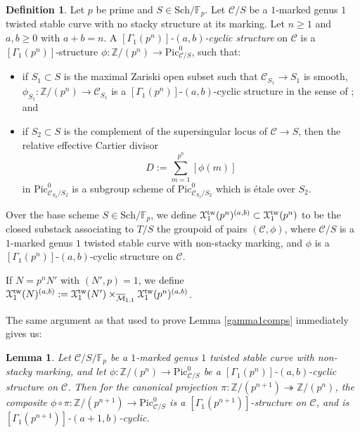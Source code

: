 \documentclass[11pt]{amsart}
\newtheorem{lemma}[subsection]{Lemma}
\theoremstyle{definition}
\newtheorem{definition}[subsection]{Definition}
\begin{document}
\begin{definition}\label{abcyclictwisted}
Let $p$ be prime and $S \in \mathrm{Sch}/\mathbb{F}_p$. Let ${\mathcal{C}}/S$ be a $1$-marked genus $1$ twisted stable curve with no stacky structure at its marking. Let $n\geq 1$ and $a,b\geq 0$ with $a+b=n$. A \textit{$[\Gamma_1(p^n)]$-$(a,b)$-cyclic structure} on ${\mathcal{C}}$ is a $[\Gamma_1(p^n)]$-structure $\phi: \mathbb{Z}/(p^n) \rightarrow \mathrm{Pic}^0_{{\mathcal{C}}/S}$, such that: 
\begin{itemize}
  \item if $S_1 \subset S$ is the maximal Zariski open subset such that ${\mathcal{C}}_{S_1} \rightarrow S_1$ is smooth, $\phi_{S_1}: \mathbb{Z}/(p^n) \rightarrow {\mathcal{C}}_{S_1}$ is a $[\Gamma_1(p^n)]$-$(a,b)$-cyclic structure in the sense of \cite{KM1}; and 
  \item if $S_2 \subset S$ is the complement of the supersingular locus of ${\mathcal{C}} \rightarrow S$, then the relative effective Cartier divisor 
  \begin{displaymath}
  D := \sum_{m=1}^{p^b} [\phi(m)]
  \end{displaymath}
  in $\mathrm{Pic}^0_{{\mathcal{C}}_{S_2}/S_2}$ is a subgroup scheme of $\mathrm{Pic}^0_{{\mathcal{C}}_{S_2}/S_2}$ which is \'etale over $S_2$. 
\end{itemize}
Over the base scheme $S \in \mathrm{Sch}/\mathbb{F}_p$, we define ${\mathbf{\EuScript{X}}}^{\mathrm{tw}}_1(p^n)^{(a,b)} \subset {\mathbf{\EuScript{X}}}^{\mathrm{tw}}_1(p^n)$ to be the closed substack associating to $T/S$ the groupoid of pairs $({\mathcal{C}},\phi)$, where ${\mathcal{C}}/S$ is a $1$-marked genus $1$ twisted stable curve with non-stacky marking, and $\phi$ is a $[\Gamma_1(p^n)]$-$(a,b)$-cyclic structure on ${\mathcal{C}}$.

If $N = p^nN'$ with $(N',p) = 1$, we define ${\mathbf{\EuScript{X}}}^{\mathrm{tw}}_1(N)^{(a,b)} := {\mathbf{\EuScript{X}}}^{\mathrm{tw}}_1(N') \times_{\overline{\mathcal{M}}_{1,1}} {\mathbf{\EuScript{X}}}^{\mathrm{tw}}_1(p^n)^{(a,b)}$.
\end{definition}

The same argument as that used to prove Lemma \ref{gamma1comps} immediately gives us:
\begin{lemma}
Let ${\mathcal{C}}/S/\mathbb{F}_p$ be a $1$-marked genus $1$ twisted stable curve with non-stacky marking, and let $\phi:\mathbb{Z}/(p^n) \rightarrow \mathrm{Pic}^0_{{\mathcal{C}}/S}$ be a $[\Gamma_1(p^n)]$-$(a,b)$-cyclic structure on ${\mathcal{C}}$. Then for the canonical projection $\pi: \mathbb{Z}/(p^{n+1}) \twoheadrightarrow \mathbb{Z}/(p^n)$, the composite $\phi \circ \pi: \mathbb{Z}/(p^{n+1}) \rightarrow \mathrm{Pic}^0_{{\mathcal{C}}/S}$ is a $[\Gamma_1(p^{n+1})]$-structure on ${\mathcal{C}}$, and is $[\Gamma_1(p^{n+1})]$-$(a+1,b)$-cyclic.
\end{lemma}
\end{document}
